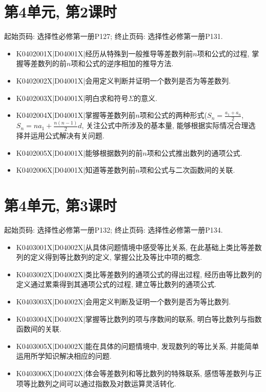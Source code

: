 \section*{第4单元, 第2课时}
起始页码: 选择性必修第一册P127; 终止页码: 选择性必修第一册P131.
\begin{itemize}
\item K0402001X|D04001X|经历从特殊到一般推导等差数列前$n$项和公式的过程, 掌握等差数列的前$n$项和公式的逆序相加的推导方法.
\item K0402002X|D04001X|会用定义判断并证明一个数列是否为等差数列.
\item K0402003X|D04001X|明白求和符号$\Sigma$的意义.
\item K0402004X|D04001X|掌握等差数列前$n$项和公式的两种形式($S_{n}=\frac{a_{1}+a_{n}}{2}$, $S_{n}=na_{1}+\frac{n(n-1)}{2}d$, 关注公式中所涉及的基本量, 能够根据实际情况合理选择并运用公式解决有关问题.
\item K0402005X|D04001X|能够根据数列的前$n$项和公式推出数列的通项公式.
\item K0402006X|D04001X|知道等差数列前$n$项和公式与二次函数间的关联.
\end{itemize}

\section*{第4单元, 第3课时}
起始页码: 选择性必修第一册P132; 终止页码: 选择性必修第一册P134.
\begin{itemize}
\item K0403001X|D04002X|从具体问题情境中感受等比关系, 在此基础上类比等差数列的定义得到等比数列的定义, 掌握公比及等比中项的概念.
\item K0403002X|D04002X|类比等差数列的通项公式的得出过程, 经历由等比数列的定义通过累乘得到其通项公式的过程, 建立等比数列的通项公式.
\item K0403003X|D04002X|会用定义判断及证明一个数列是否为等比数列.
\item K0403004X|D04002X|掌握等比数列的项与序数间的联系, 明白等比数列与指数函数间的关联.
\item K0403005X|D04002X|能在具体的问题情境中, 发现数列的等比关系, 并能简单运用所学知识解决相应的问题.
\item K0403006X|D04002X|体会等差数列和等比数列的特殊联系, 感悟等差数列与正项等比数列之间可以通过指数及对数运算灵活转化.
\end{itemize}

